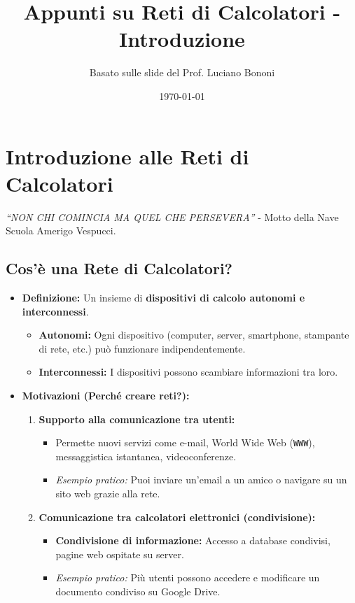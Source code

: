 \documentclass{article}
\title{Appunti su Reti di Calcolatori - Introduzione}
\author{Basato sulle slide del Prof. Luciano Bononi}
\date{\today}
\begin{document}
\maketitle
\tableofcontents
\newpage

\section{Introduzione alle Reti di Calcolatori}

\textit{“NON CHI COMINCIA MA QUEL CHE PERSEVERA”} - Motto della Nave Scuola Amerigo Vespucci.

\subsection{Cos'è una Rete di Calcolatori?}
\begin{itemize}
    \item \textbf{Definizione:} Un insieme di \textbf{dispositivi di calcolo autonomi e interconnessi}.
    \begin{itemize}
        \item \textbf{Autonomi:} Ogni dispositivo (computer, server, smartphone, stampante di rete, etc.) può funzionare indipendentemente.
        \item \textbf{Interconnessi:} I dispositivi possono scambiare informazioni tra loro.
    \end{itemize}
    \item \textbf{Motivazioni (Perché creare reti?):}
    \begin{enumerate}
        \item \textbf{Supporto alla comunicazione tra utenti:}
        \begin{itemize}
            \item Permette nuovi servizi come e-mail, World Wide Web (\texttt{WWW}), messaggistica istantanea, videoconferenze.
            \item \textit{Esempio pratico:} Puoi inviare un'email a un amico o navigare su un sito web grazie alla rete.
        \end{itemize}
        \item \textbf{Comunicazione tra calcolatori elettronici (condivisione):}
        \begin{itemize}
            \item \textbf{Condivisione di informazione:} Accesso a database condivisi, pagine web ospitate su server.
            \item \textit{Esempio pratico:} Più utenti possono accedere e modificare un documento condiviso su Google Drive.

\end{itemize}
\end{enumerate}
\end{itemize}
\end{document}
